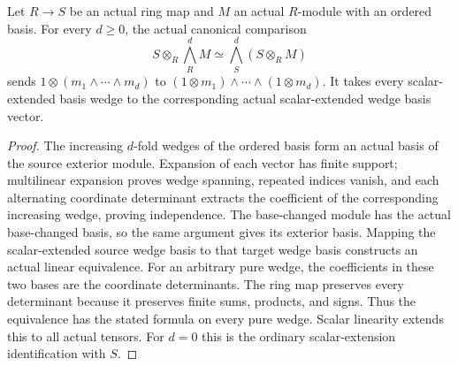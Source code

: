 \begin{theorem}
\label{sc0-canonical-port:ext:finite-free-exterior-base-change}
\leanok
Let \(R\to S\) be an actual ring map and \(M\) an actual
\(R\)-module with an ordered basis. For every \(d\geq0\),
the actual canonical comparison
\[
 S\otimes_R\bigwedge_R^d M
 \simeq\bigwedge_S^d(S\otimes_R M)
\]
sends \(1\otimes(m_1\wedge\cdots\wedge m_d)\) to
\((1\otimes m_1)\wedge\cdots\wedge(1\otimes m_d)\).
It takes every scalar-extended basis wedge to the
corresponding actual scalar-extended wedge basis vector.
\end{theorem}
\begin{proof}
The increasing \(d\)-fold wedges of the ordered basis
form an actual basis of the source exterior module.
Expansion of each vector has finite support; multilinear
expansion proves wedge spanning, repeated indices vanish,
and each alternating coordinate determinant extracts
the coefficient of the corresponding increasing wedge,
proving independence. The base-changed module has the
actual base-changed basis, so the same argument gives
its exterior basis. Mapping the scalar-extended source
wedge basis to that target wedge basis constructs an
actual linear equivalence. For an arbitrary pure wedge,
the coefficients in these two bases are the coordinate
determinants. The ring map preserves every determinant
because it preserves finite sums, products, and signs.
Thus the equivalence has the stated formula on every
pure wedge. Scalar linearity extends this to all
actual tensors. For \(d=0\) this is the ordinary
scalar-extension identification with \(S\).
\end{proof}

